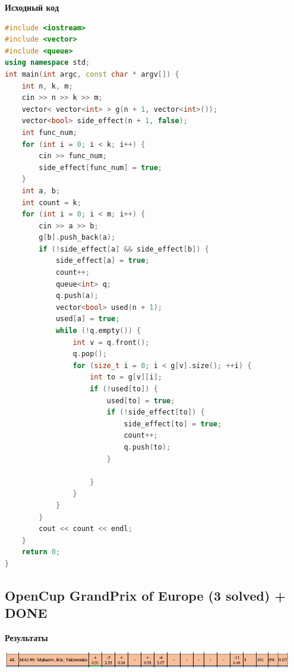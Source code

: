 \documentclass[a4paper,12pt]{article}
\begin{document}
\newpage
\textbf{{\large Исходный код}} \\
\begin{lstlisting}[language=C++]
#include <iostream>
#include <vector>
#include <queue>
using namespace std;
int main(int argc, const char * argv[]) {
    int n, k, m;
    cin >> n >> k >> m;
    vector< vector<int> > g(n + 1, vector<int>());
    vector<bool> side_effect(n + 1, false);
    int func_num;
    for (int i = 0; i < k; i++) {
        cin >> func_num;
        side_effect[func_num] = true;
    }
    int a, b;
    int count = k;
    for (int i = 0; i < m; i++) {
        cin >> a >> b;
        g[b].push_back(a);
        if (!side_effect[a] && side_effect[b]) {
            side_effect[a] = true;
            count++;
            queue<int> q;
            q.push(a);
            vector<bool> used(n + 1);
            used[a] = true;
            while (!q.empty()) {
                int v = q.front();
                q.pop();
                for (size_t i = 0; i < g[v].size(); ++i) {
                    int to = g[v][i];
                    if (!used[to]) {
                        used[to] = true;
                        if (!side_effect[to]) {
                            side_effect[to] = true;
                            count++;
                            q.push(to);
                        }
                        
                    }
                }
            }
        }
        cout << count << endl;
    }
    return 0;
}
\end{lstlisting}








%
%
\newpage
\subsection{OpenCup GrandPrix of Europe (3 solved) + DONE}

\textbf{{\large Результаты}} \\
\begin{center}
\includegraphics[width=0.95\textwidth]{OC_Europe/result.png}\\ [1cm]
\end{center}
\end{document}
